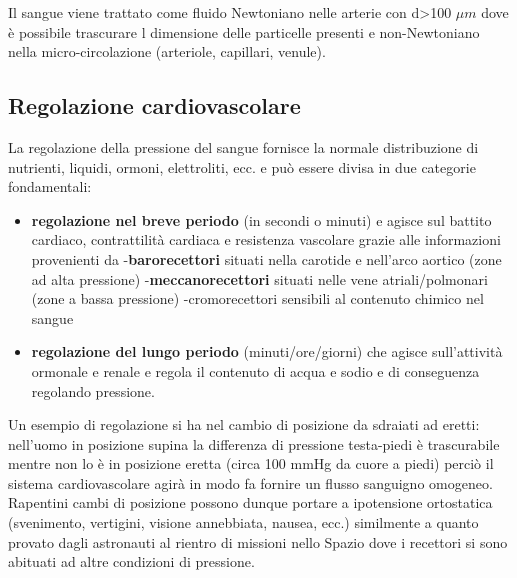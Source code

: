 \documentclass[10pt]{article}
\begin{document}
Il sangue viene trattato come fluido Newtoniano nelle arterie con d>100 $\mu m$ dove è possibile trascurare l dimensione delle particelle presenti e non-Newtoniano nella micro-circolazione (arteriole, capillari, venule).

\subsection{Regolazione cardiovascolare}

La regolazione della pressione del sangue fornisce la normale distribuzione di nutrienti, liquidi, ormoni, elettroliti, ecc. e può essere divisa in due categorie fondamentali:
\begin{itemize}
    \item \textbf{regolazione nel breve periodo} (in secondi o minuti) e agisce sul battito cardiaco, contrattilità cardiaca e resistenza vascolare grazie alle informazioni provenienti da
    \subitem -\textbf{barorecettori} situati nella carotide e nell'arco aortico (zone ad alta pressione)
    \subitem -\textbf{meccanorecettori} situati nelle vene atriali/polmonari (zone a bassa pressione)
    \subitem -cromorecettori sensibili al contenuto chimico nel sangue
    \item \textbf{regolazione del lungo periodo} (minuti/ore/giorni) che agisce sull'attività ormonale e renale e regola il contenuto di acqua e sodio e di conseguenza regolando pressione.
\end{itemize}

Un esempio di regolazione si ha nel cambio di posizione da sdraiati ad eretti: nell'uomo in posizione supina la differenza di pressione testa-piedi è trascurabile mentre non lo è in posizione eretta (circa 100 mmHg da cuore a piedi) perciò il sistema cardiovascolare agirà in modo fa fornire un flusso sanguigno omogeneo. Rapentini cambi di posizione possono dunque portare a ipotensione ortostatica (svenimento, vertigini, visione annebbiata, nausea, ecc.) similmente a quanto provato dagli astronauti al rientro di missioni nello Spazio dove i recettori si sono abituati ad altre condizioni di pressione.
\end{document}
